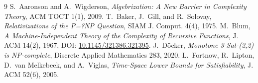 \documentclass[11pt]{article}
\begin{document}
\begin{thebibliography}{9}
 S.~Aaronson and A.~Wigderson,
\emph{Algebrization: A New Barrier in Complexity Theory}, ACM TOCT 1(1), 2009.
 T.~Baker, J.~Gill, and R.~Solovay,
\emph{Relativizations of the P=?NP Question}, SIAM J. Comput. 4(4), 1975.
 M.~Blum,
\emph{A Machine-Independent Theory of the Complexity of Recursive Functions},
J. ACM 14(2), 1967, DOI: \href{https://doi.org/10.1145/321386.321395}{10.1145/321386.321395}.
 J.~D\"ocker,
\emph{Monotone 3-Sat-(2,2) is NP-complete}, Discrete Applied Mathematics 283, 2020.
 L.~Fortnow, R.~Lipton, D.~van Melkebeek, and A.~Viglas,
\emph{Time-Space Lower Bounds for Satisfiability}, J. ACM 52(6), 2005.
\end{thebibliography}

\end{document}
